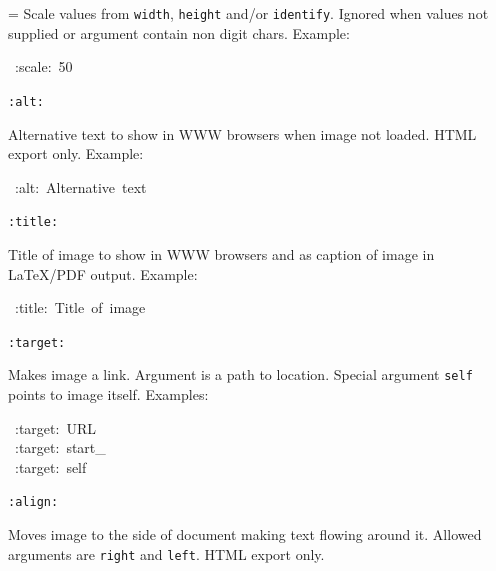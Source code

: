 \documentclass[12pt]{article}
\newenvironment{deflist}[1]{%
\begin{list}{}
{\renewcommand{\makelabel}[1]{\textbf{##1}\hfill}
\settowidth{\labelwidth}{\textbf{#1}}
\leftmargin=\labelwidth
\advance \leftmargin\labelsep}}
{\end{list}}
\begin{document}
\begin{itemize}
\begin{deflist}{iii}
Scale values from \texttt{width}, \texttt{height} and/or \texttt{identify}. Ignored
when values not supplied or argument contain non digit chars. Example:

\begin{ttfamily}\begin{flushleft}
\mbox{~:scale:~50}\\
\end{flushleft}\end{ttfamily}

\item[ \texttt{:alt:}]

Alternative text to show in WWW browsers when image not loaded. HTML
export only. Example:

\begin{ttfamily}\begin{flushleft}
\mbox{~:alt:~Alternative~text}\\
\end{flushleft}\end{ttfamily}

\item[ \texttt{:title:}]

Title of image to show in WWW browsers and as caption of image in
\LaTeX{}/PDF output. Example:

\begin{ttfamily}\begin{flushleft}
\mbox{~:title:~Title~of~image}\\
\end{flushleft}\end{ttfamily}

\item[ \texttt{:target:}]

Makes image a link. Argument is a path to location. Special argument
\texttt{self} points to image itself. Examples:

\begin{ttfamily}\begin{flushleft}
\mbox{~:target:~URL}\\
\mbox{~:target:~start\_}\\
\mbox{~:target:~self}\\
\end{flushleft}\end{ttfamily}

\item[ \texttt{:align:}]

Moves image to the side of document making text flowing around it.
Allowed arguments are \texttt{right} and \texttt{left}. HTML export only.


\end{deflist}
\end{itemize}
\end{document}
